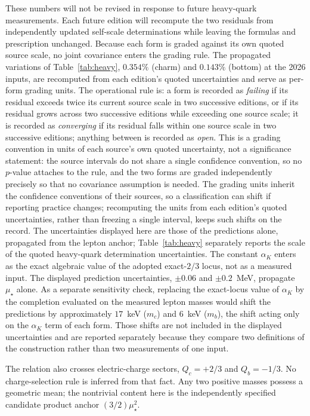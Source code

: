 \documentclass[aps,twocolumn,superscriptaddress,nofootinbib,floatfix]{revtex4-2}
\newcommand{\mstar}{\mu_\star}
\newcommand{\alphaK}{\alpha_K}
\begin{document}
These numbers will not be revised in response to future heavy-quark measurements. Each future edition will recompute the two residuals from independently updated self-scale determinations while leaving the formulas and prescription unchanged. Because each form is graded against its own quoted source scale, no joint covariance enters the grading rule. The propagated variations of Table~\ref{tab:heavy}, $0.354\%$ (charm) and $0.143\%$ (bottom) at the 2026 inputs, are recomputed from each edition's quoted uncertainties and serve as per-form grading units. The operational rule is: a form is recorded as \emph{failing} if its residual exceeds twice its current source scale in two successive editions, or if its residual grows across two successive editions while exceeding one source scale; it is recorded as \emph{converging} if its residual falls within one source scale in two successive editions; anything between is recorded as \emph{open}. This is a grading convention in units of each source's own quoted uncertainty, not a significance statement: the source intervals do not share a single confidence convention, so no $p$-value attaches to the rule, and the two forms are graded independently precisely so that no covariance assumption is needed. The grading units inherit the confidence conventions of their sources, so a classification can shift if reporting practice changes; recomputing the units from each edition's quoted uncertainties, rather than freezing a single interval, keeps such shifts on the record. The uncertainties displayed here are those of the predictions alone, propagated from the lepton anchor; Table~\ref{tab:heavy} separately reports the scale of the quoted heavy-quark determination uncertainties. The constant $\alphaK$ enters as the exact algebraic value of the adopted exact-$2/3$ locus, not as a measured input. The displayed prediction uncertainties, $\pm0.06$ and $\pm0.2$~MeV, propagate $\mstar$ alone. As a separate sensitivity check, replacing the exact-locus value of $\alphaK$ by the completion evaluated on the measured lepton masses would shift the predictions by approximately $17$~keV ($m_c$) and $6$~keV ($m_b$), the shift acting only on the $\alphaK$ term of each form. Those shifts are not included in the displayed uncertainties and are reported separately because they compare two definitions of the construction rather than two measurements of one input.

The relation also crosses electric-charge sectors, $Q_c=+2/3$ and $Q_b=-1/3$. No charge-selection rule is inferred from that fact. Any two positive masses possess a geometric mean; the nontrivial content here is the independently specified candidate product anchor $(3/2)\mstar^2$.
\end{document}
